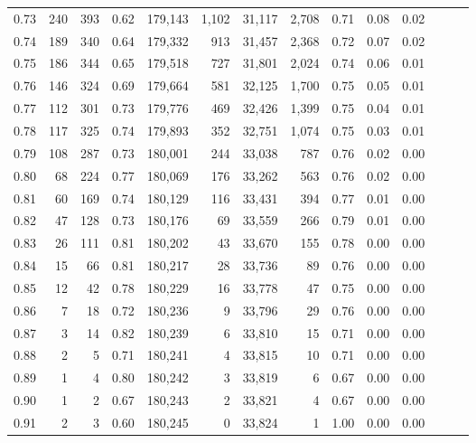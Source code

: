 \begin{tabular}{rrrrrrrrrrrrrr}
0.73 &    240 &    393 &  0.62 &  179,143 &    1,102 &  31,117 &   2,708 &  0.71 &  0.08 &      0.02 \\
0.74 &    189 &    340 &  0.64 &  179,332 &      913 &  31,457 &   2,368 &  0.72 &  0.07 &      0.02 \\
0.75 &    186 &    344 &  0.65 &  179,518 &      727 &  31,801 &   2,024 &  0.74 &  0.06 &      0.01 \\
0.76 &    146 &    324 &  0.69 &  179,664 &      581 &  32,125 &   1,700 &  0.75 &  0.05 &      0.01 \\
0.77 &    112 &    301 &  0.73 &  179,776 &      469 &  32,426 &   1,399 &  0.75 &  0.04 &      0.01 \\
0.78 &    117 &    325 &  0.74 &  179,893 &      352 &  32,751 &   1,074 &  0.75 &  0.03 &      0.01 \\
0.79 &    108 &    287 &  0.73 &  180,001 &      244 &  33,038 &     787 &  0.76 &  0.02 &      0.00 \\
0.80 &     68 &    224 &  0.77 &  180,069 &      176 &  33,262 &     563 &  0.76 &  0.02 &      0.00 \\
0.81 &     60 &    169 &  0.74 &  180,129 &      116 &  33,431 &     394 &  0.77 &  0.01 &      0.00 \\
0.82 &     47 &    128 &  0.73 &  180,176 &       69 &  33,559 &     266 &  0.79 &  0.01 &      0.00 \\
0.83 &     26 &    111 &  0.81 &  180,202 &       43 &  33,670 &     155 &  0.78 &  0.00 &      0.00 \\
0.84 &     15 &     66 &  0.81 &  180,217 &       28 &  33,736 &      89 &  0.76 &  0.00 &      0.00 \\
0.85 &     12 &     42 &  0.78 &  180,229 &       16 &  33,778 &      47 &  0.75 &  0.00 &      0.00 \\
0.86 &      7 &     18 &  0.72 &  180,236 &        9 &  33,796 &      29 &  0.76 &  0.00 &      0.00 \\
0.87 &      3 &     14 &  0.82 &  180,239 &        6 &  33,810 &      15 &  0.71 &  0.00 &      0.00 \\
0.88 &      2 &      5 &  0.71 &  180,241 &        4 &  33,815 &      10 &  0.71 &  0.00 &      0.00 \\
0.89 &      1 &      4 &  0.80 &  180,242 &        3 &  33,819 &       6 &  0.67 &  0.00 &      0.00 \\
0.90 &      1 &      2 &  0.67 &  180,243 &        2 &  33,821 &       4 &  0.67 &  0.00 &      0.00 \\
0.91 &      2 &      3 &  0.60 &  180,245 &        0 &  33,824 &       1 &  1.00 &  0.00 &      0.00 \\

\end{tabular}
